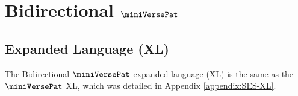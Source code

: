 

\ificfp 
\else

\chapter{\texorpdfstring{Bidirectional $\miniVersePat$}{Bidirectional miniVerseS}}\label{appendix:simple-implicits}

\section{Expanded Language (XL)}
The Bidirectional $\miniVersePat$ expanded language (XL) is the same as the  $\miniVersePat$ XL, which was detailed in Appendix \ref{appendix:SES-XL}. %

